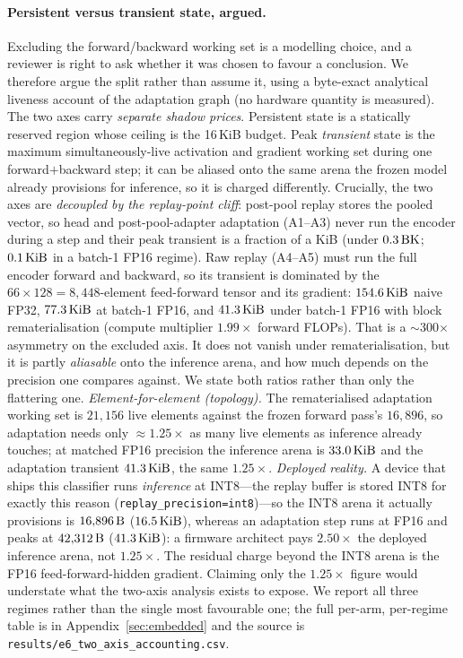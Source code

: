 \paragraph{Persistent versus transient state, argued.} Excluding the
forward/backward working set is a modelling choice, and a reviewer is right to
ask whether it was chosen to favour a conclusion. We therefore argue the split
rather than assume it, using a byte-exact analytical liveness account of the
adaptation graph (no hardware quantity is measured). The two axes carry
\emph{separate shadow prices}. Persistent state is a statically reserved region
whose ceiling is the 16\,KiB budget. Peak \emph{transient} state is the maximum
simultaneously-live activation and gradient working set during one
forward$+$backward step; it can be aliased onto the same arena the frozen model
already provisions for inference, so it is charged differently. Crucially, the
two axes are \emph{decoupled by the replay-point cliff}: post-pool replay stores
the pooled vector, so head and post-pool-adapter adaptation (A1--A3) never run
the encoder during a step and their peak transient is a fraction of a KiB
(under $0.3\,\mathrm{B}\mathrm{K}$; $0.1\,\mathrm{KiB}$ in a batch-1 FP16 regime). Raw replay
(A4--A5) must run the full encoder forward and backward, so its transient is
dominated by the $66\times128 = 8{,}448$-element feed-forward tensor and its
gradient: $154.6\,\mathrm{KiB}$ naive FP32, $77.3\,\mathrm{KiB}$ at batch-1 FP16, and $41.3\,\mathrm{KiB}$
under batch-1 FP16 with block rematerialisation (compute multiplier
$1.99\times$ forward FLOPs). That is a $\sim$300$\times$ asymmetry on the
excluded axis. It does not vanish under rematerialisation, but it is partly
\emph{aliasable} onto the inference arena, and how much depends on the precision
one compares against. We state both ratios rather than only the flattering one.
\emph{Element-for-element (topology).} The rematerialised adaptation working set
is $21{,}156$ live elements against the frozen forward pass's $16{,}896$, so
adaptation needs only $\approx\!1.25\times$ as many live elements as inference
already touches; at matched FP16 precision the inference arena is $33.0\,\mathrm{KiB}$ and
the adaptation transient $41.3\,\mathrm{KiB}$, the same $1.25\times$. \emph{Deployed
reality.} A device that ships this classifier runs \emph{inference} at INT8---the
replay buffer is stored INT8 for exactly this reason
(\texttt{replay\_precision=int8})---so the INT8 arena it actually provisions is
$16{,}896\,\mathrm{B}$ ($16.5\,\mathrm{KiB}$), whereas an adaptation step runs at FP16 and peaks
at $42{,}312\,\mathrm{B}$ ($41.3\,\mathrm{KiB}$): a firmware architect pays
$\mathbf{2.50\times}$ the deployed inference arena, not $1.25\times$. The
residual charge beyond the INT8 arena is the FP16 feed-forward-hidden gradient.
Claiming only the $1.25\times$ figure would understate what the two-axis analysis
exists to expose. We report all three regimes rather than the single most
favourable one; the full per-arm, per-regime table is in
Appendix~\ref{sec:embedded} and the source is
\texttt{results/e6\_two\_axis\_accounting.csv}.


